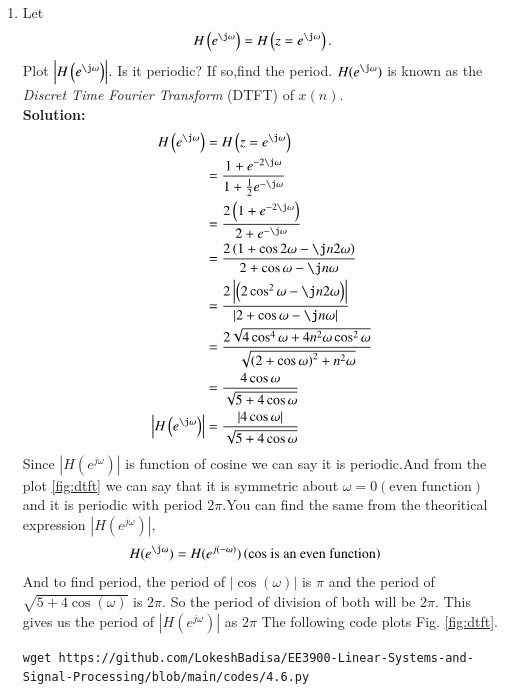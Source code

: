 \documentclass[journal,12pt,twocolumn]{IEEEtran}
\newcommand{\solution}{\noindent \textbf{Solution: }}
\providecommand{\brak}[1]{\ensuremath{\left(#1\right)}}
\providecommand{\abs}[1]{\left\vert#1\right\vert}
\numberwithin{equation}{section}
\renewcommand\thesection{\arabic{section}}
\begin{document}
\begin{enumerate}[label=\thesection.\arabic*]
%
\item 
Let
\begin{equation}
H\brak{e^{\j \omega}} = H\brak{z = e^{\j \omega}}.
\end{equation}
Plot $\abs{H\brak{e^{\j \omega}}}$. Is it periodic? If so,find the period. $H(e^{\j \omega})$ is
known as the {\em Discret Time Fourier Transform} (DTFT) of $x(n)$.
\\
\solution 
\begin{align}
H\brak{e^{\j \omega}} &= H\brak{z = e^{\j \omega}}\\
&= \frac{1 + e^{-2 \j \omega}}{1 + \frac{1}{2} e^{-\j \omega}}\\
&= \frac{2\brak{1 + e^{-2 \j \omega}}}{2 + e^{-\j \omega}}\\
&= \frac{2\brak{1 + \cos{2 \omega}-\j n{2\omega}}}{2 + \cos{\omega}-\j n{ \omega}}\\
&= \frac{2\abs{\brak{2\cos^2 \omega-\j n{2\omega}}}}{\abs{2 + \cos{\omega}-\j n{ \omega}}}\\
&= \frac{2\sqrt{4\cos^4 \omega+4n^2 \omega \cos^2 \omega}}{\sqrt{\brak{2 + \cos \omega}^2+ n^2 \omega }}\\
&=\frac{4\cos\omega}{\sqrt{5 + 4\cos \omega}}\\
\abs{H\brak{e^{\j \omega}} }&=\frac{\abs{4\cos\omega}}{\sqrt{5 + 4\cos \omega}}
\end{align}
Since $\abs{H(e^{j\omega})}$ is function of cosine we can say it is periodic.And from the plot \ref{fig:dtft} we can say that it is symmetric about $\omega = 0\brak{\text{even function}}$ and it is periodic with period $2\pi$.You can find the same from the theoritical expression $\abs{H\brak{e^{j \omega}}}$, 
       \begin{align}
         H(e^{\j \omega}) &= H(e^{j(-\omega)})\brak{\text{cos is an even function}}
       \end{align}
    And to find period, the period of $\abs{\cos(\omega)}$ is $\pi$ and the period of $\sqrt{5 + 4\cos\brak{\omega}}$ is $2\pi$. So the period of division of both will be $2\pi$.
     This gives us the period of $\abs{H(e^{j\omega})}$ as $2\pi$
 The following code plots Fig. \ref{fig:dtft}.
\begin{lstlisting}
wget https://github.com/LokeshBadisa/EE3900-Linear-Systems-and-Signal-Processing/blob/main/codes/4.6.py
\end{lstlisting}
\begin{figure}[!ht]
\centering

\end{figure}
\end{enumerate}
\end{document}
